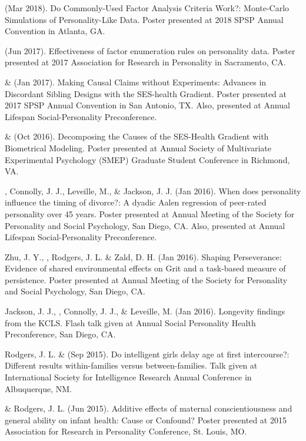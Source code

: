 \item\meb (Mar 2018). Do Commonly-Used Factor Analysis Criteria Work?: Monte-Carlo Simulations of Personality-Like Data. Poster presented at 2018 SPSP Annual Convention in Atlanta, GA. 
\item\meb (Jun 2017). Effectiveness of factor enumeration rules on personality data. Poster presented at 2017 Association for Research in Personality in Sacramento, CA.
%
\item\meb \& \joe (Jan 2017). Making Causal Claims without Experiments: Advances in Discordant Sibling Designs with the SES-health Gradient. Poster presented at 2017 SPSP Annual Convention in San Antonio, TX. Also, presented at Annual Lifespan Social-Personality Preconference.
%
\item\meb \& \joe (Oct 2016). Decomposing the Causes of the SES-Health Gradient with Biometrical Modeling. Poster presented at Annual Society of Multivariate Experimental Psychology (SMEP) Graduate Student Conference in Richmond, VA.
%
\item \meb, Connolly, J. J., Leveille, M., \& Jackson, J. J. (Jan 2016). When does personality influence the timing of divorce?: A dyadic Aalen regression of peer-rated personality over 45 years. Poster presented at Annual Meeting of the Society for Personality and Social Psychology, San Diego, CA. Also, presented at Annual Lifespan Social-Personality Preconference.
%
\item Zhu, J. Y., \meb, Rodgers, J. L. \& Zald, D. H. (Jan 2016). Shaping Perseverance: Evidence of shared environmental effects on Grit and a task-based measure of persistence. Poster presented at Annual Meeting of the Society for Personality and Social Psychology, San Diego, CA.
\item Jackson, J. J., \meb, Connolly, J. J., \& Leveille, M. (Jan 2016). Longevity findings from the KCLS. Flash talk given at Annual Social Personality Health Preconference, San Diego, CA. %
%
\item Rodgers, J. L. \& \meb (Sep 2015). Do intelligent girls delay age at first intercourse?: Different results within-families versus between-families. Talk given at International Society for Intelligence Research Annual Conference in Albuquerque, NM.
%
\item \meb \& Rodgers, J. L. (Jun 2015). Additive effects of maternal conscientiousness and general ability on infant health: Cause or Confound? Poster presented at 2015 Association for Research in Personality Conference, St. Louis, MO.%
